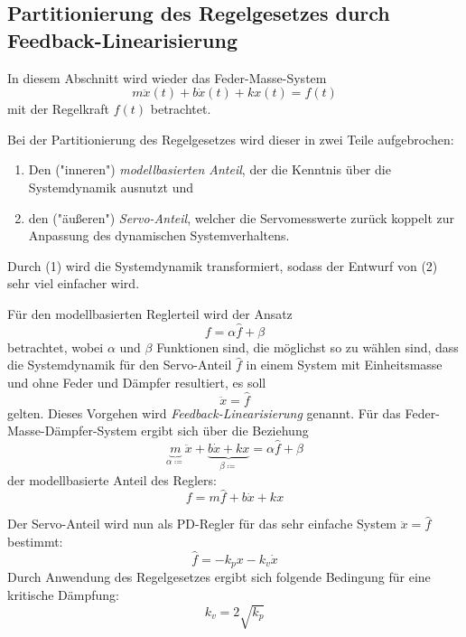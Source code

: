 		\subsection{Partitionierung des Regelgesetzes durch Feedback-Linearisierung}
			\label{sec:feedbacklinearization}
		
			In diesem Abschnitt wird wieder das Feder-Masse-System
			\begin{equation*}
				m\ddot{x}(t) + b\dot{x}(t) + kx(t) = f(t)
			\end{equation*}
			mit der Regelkraft \( f(t) \) betrachtet.
		
			Bei der Partitionierung des Regelgesetzes wird dieser in zwei Teile aufgebrochen:
			\begin{enumerate}
				\item Den ("inneren") \emph{modellbasierten Anteil}, der die Kenntnis über die Systemdynamik ausnutzt und
				\item den ("äußeren") \emph{Servo-Anteil}, welcher die Servomesswerte zurück koppelt zur Anpassung des dynamischen Systemverhaltens.
			\end{enumerate}
			Durch (1) wird die Systemdynamik transformiert, sodass der Entwurf von (2) sehr viel einfacher wird.
			
			Für den modellbasierten Reglerteil wird der Ansatz
			\begin{equation*}
				f = \alpha \hat{f} + \beta
			\end{equation*}
			betrachtet, wobei \( \alpha \) und \( \beta \) Funktionen sind, die möglichst so zu wählen sind, dass die Systemdynamik für den Servo-Anteil \( \hat{f} \) in einem System mit Einheitsmasse und ohne Feder und Dämpfer resultiert, \dh es soll
			\begin{equation*}
				\ddot{x} = \hat{f}
			\end{equation*}
			gelten. Dieses Vorgehen wird \emph{Feedback-Linearisierung} genannt. Für das Feder-Masse-Dämpfer-System ergibt sich über die Beziehung
			\begin{equation*}
				\underbrace{m}_{\alpha \coloneqq}\ddot{x} + \underbrace{b\dot{x} + kx}_{\beta \coloneqq} = \alpha \hat{f} + \beta
			\end{equation*}
			der modellbasierte Anteil des Reglers:
			\begin{equation*}
				f = m \hat{f} + b\dot{x} + kx
			\end{equation*}
			
			Der Servo-Anteil wird nun als PD-Regler für das sehr einfache System \( \ddot{x} = \hat{f} \) bestimmt:
			\begin{equation*}
				\hat{f} = -k_p x - k_v \dot{x}
			\end{equation*}
			Durch Anwendung des Regelgesetzes ergibt sich folgende Bedingung für eine kritische Dämpfung:
			\begin{equation*}
				k_v = 2 \sqrt{k_p}
			\end{equation*}
			
